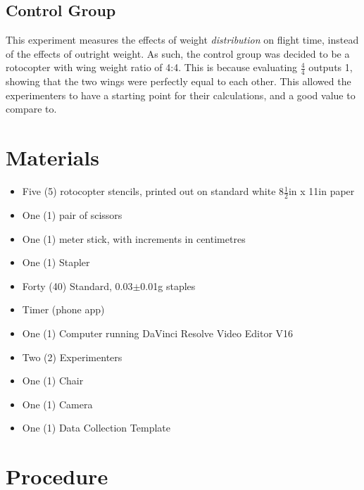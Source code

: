 \documentclass[]{article}
\theoremstyle{definition}
\begin{document}
\subsection{Control Group}
This experiment measures the effects of weight \textit{distribution} on flight time, instead of the effects of outright weight. As such, the control group was decided to be a rotocopter with wing weight ratio of 4:4. This is because evaluating $\frac{4}{4}$ outputs 1, showing that the two wings were perfectly equal to each other. This allowed the experimenters to have a starting point for their calculations, and a good value to compare to.

\section{Materials}
\begin{itemize}
    \item Five (5) rotocopter stencils, printed out on standard white $8\frac{1}{2}$in x 11in paper
    \item One (1) pair of scissors
    \item One (1) meter stick, with increments in centimetres
    \item One (1) Stapler 
    \item Forty (40) Standard, 0.03$\pm$0.01g staples
    \item Timer (phone app) 
    \item One (1) Computer running DaVinci Resolve Video Editor V16
    \item Two (2) Experimenters
    \item One (1) Chair
    \item One (1) Camera
    \item One (1) Data Collection Template
\end{itemize} 

\section{Procedure} \label{Procedure}
\end{document}
